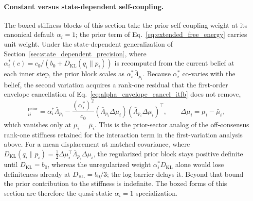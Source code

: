 \documentclass[11pt]{article}
\begin{document}
\paragraph{Constant versus state-dependent self-coupling.} The boxed stiffness blocks of this section take the prior self-coupling weight at its canonical default $\alpha_i = 1$; the prior term of Eq.~\eqref{eq:extended_free_energy} carries unit weight. Under the state-dependent generalization of Section~\ref{sec:state_dependent_precision}, where $\alpha_i^*(c) = c_0/(b_0 + D_{\mathrm{KL}}(q_i \| p_i))$ is recomputed from the current belief at each inner step, the prior block scales as $\alpha_i^* \bar{\Lambda}_{p_i}$. Because $\alpha_i^*$ co-varies with the belief, the second variation acquires a rank-one residual that the first-order envelope cancellation of Eq.~\eqref{eq:alpha_envelope_cancel_itfb} does not remove,
\begin{equation}
[M_{\mu\mu}]_{ii}^{\text{prior}} = \alpha_i^* \bar{\Lambda}_{p_i} - \frac{(\alpha_i^*)^2}{c_0}\left(\bar{\Lambda}_{p_i}\Delta\mu_i\right)\left(\bar{\Lambda}_{p_i}\Delta\mu_i\right)^\top, \qquad \Delta\mu_i = \mu_i - \bar{\mu}_i,
\end{equation}
which vanishes only at $\mu_i = \bar{\mu}_i$. This is the prior-sector analog of the off-consensus rank-one stiffness retained for the interaction term in the first-variation analysis above. For a mean displacement at matched covariance, where $D_{\mathrm{KL}}(q_i \| p_i) = \tfrac{1}{2}\Delta\mu_i^\top \bar{\Lambda}_{p_i}\Delta\mu_i$, the regularized prior block stays positive definite until $D_{\mathrm{KL}} = b_0$, whereas the unregularized weight $\alpha_i^* D_{\mathrm{KL}}$ alone would lose definiteness already at $D_{\mathrm{KL}} = b_0/3$; the log-barrier delays it. Beyond that bound the prior contribution to the stiffness is indefinite. The boxed forms of this section are therefore the quasi-static $\alpha_i = 1$ specialization.
\end{document}
